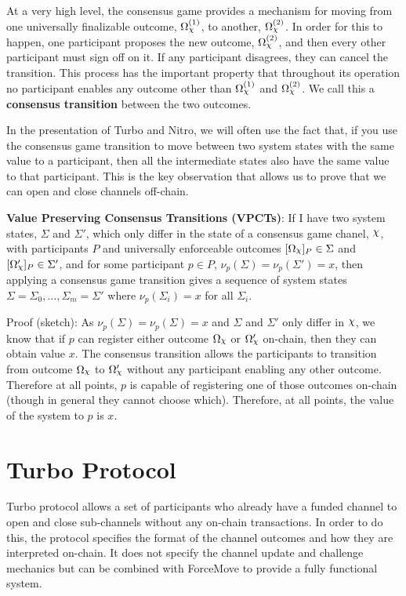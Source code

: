 \documentclass{article}
\begin{document}
At a very high level, the consensus game provides a mechanism for moving from one universally
finalizable outcome, $\Omega_\rchi^{(1)}$, to another, $\Omega_\rchi^{(2)}$. 
In order for this to happen, one participant proposes the new outcome, $\Omega_\rchi^{(2)}$, and then
every other participant must sign off on it. 
If any participant disagrees, they can cancel the transition.
This process has the important property that throughout its operation no participant enables
any outcome other than $\Omega_\rchi^{(1)}$ and $\Omega_\rchi^{(2)}$.
We call this a \textbf{consensus transition} between the two outcomes.

In the presentation of Turbo and Nitro, we will often use the fact that, if you use the
consensus game transition to move between two system states with the same value to a
participant, then all the intermediate states also have the same value to that participant.
This is the key observation that allows us to prove that we can open and close channels
off-chain.

\textbf{Value Preserving Consensus Transitions (VPCTs)}:
If I have two system states, $\Sigma$ and $\Sigma'$, which only differ in the state of
a consensus game chanel, $\rchi$, with participants $P$ and universally enforceable outcomes
$\enf{\Omega_\rchi}_P \in \Sigma$ and $\enf{\Omega'_\rchi}_P \in \Sigma'$, and 
for some participant $p \in P$, $\nu_p(\Sigma) = \nu_p(\Sigma') = x$, then
applying a consensus game transition gives a sequence of system states 
$\Sigma = \Sigma_0, \dots, \Sigma_m = \Sigma'$ where $\nu_p(\Sigma_i) = x$ for all $\Sigma_i$.

Proof (sketch): As $\nu_p(\Sigma) = \nu_p(\Sigma) = x$ and $\Sigma$ and $\Sigma'$ only differ
in $\rchi$, we know that if $p$ can register either outcome $\Omega_\rchi$ or $\Omega'_\rchi$ on-chain, then
they can obtain value $x$. The consensus transition allows the participants to transition
from outcome $\Omega_\rchi$ to $\Omega'_\rchi$ without any participant enabling any other outcome.
Therefore at all points, $p$ is capable of registering one of those outcomes on-chain (though
in general they cannot choose which).
Therefore, at all points, the value of the system to $p$ is $x$.

\section{Turbo Protocol}

Turbo protocol allows a set of participants who already have a funded channel to open and
close sub-channels without any on-chain transactions. 
In order to do this, the protocol specifies the format of the channel outcomes and how
they are interpreted on-chain.
It does not specify the channel update and challenge mechanics but can be combined with
ForceMove to provide a fully functional system.
\end{document}
